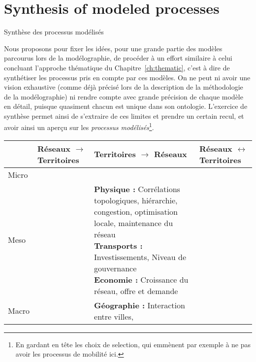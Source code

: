 


\newpage

\section*{Synthesis of modeled processes}{Synthèse des processus modélisés}



Nous proposons pour fixer les idées, pour une grande partie des modèles parcourus lors de la modélographie, de procéder à un effort similaire à celui concluant l'approche thématique du Chapitre~\ref{ch:thematic}, c'est à dire de synthétiser les processus pris en compte par ces modèles. On ne peut ni avoir une vision exhaustive (comme déjà précisé lors de la description de la méthodologie de la modélographie) ni rendre compte avec grande précision de chaque modèle en détail, puisque quasiment chacun est unique dans son ontologie. L'exercice de synthèse permet ainsi de s'extraire de ces limites et prendre un certain recul, et avoir ainsi un aperçu sur les \emph{processus modélisés}\footnote{En gardant en tête les choix de selection, qui emmènent par exemple à ne pas avoir les processus de mobilité ici.}.





\begin{table}%
\begin{tabular}{|l|p{5cm}|p{5cm}|p{5cm}|}
\hline
 & Réseaux $\rightarrow$ Territoires & Territoires $\rightarrow$ Réseaux & Réseaux $\leftrightarrow$ Territoires\\ \hline
Micro & &  &  \\ \hline
Meso &  & \makecell{\textbf{Physique : } Corrélations topologiques, hiérarchie, congestion, optimisation locale, maintenance du réseau\\\textbf{Transports : } Investissements, Niveau de gouvernance\\\textbf{Economie : } Croissance du réseau, offre et demande } &  \\ \hline
Macro &  & \textbf{Géographie : } Interaction entre villes,  & \\ \hline
\end{tabular}
\end{table}


